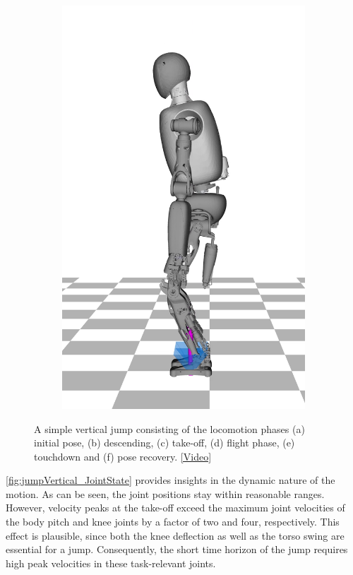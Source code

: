 \begin{figure}
\begin{subfigure}{.16\textwidth}
	\includegraphics[width=1\linewidth]{fig/jumpVertical/snaps/6x}
	\caption{}
\end{subfigure}%
\caption[A simple vertical jump]{A simple vertical jump consisting of the locomotion phases (a) initial pose, (b) descending, (c) take-off, (d) flight phase, (e) touchdown and (f) pose recovery. \href{https://github.com/julesser/ma-thesis-simulation-results/blob/master/Jump_Vertical_10cm_NoJLims/crocoddyl_side.mp4}{[Video]}}
\label{fig:jumpVertical_Snaps}
\end{figure} 

\cref{fig:jumpVertical_JointState} provides insights in the dynamic nature of the motion. As can be seen, the joint positions stay within reasonable ranges. However, velocity peaks at the take-off exceed the maximum joint velocities of the body pitch and knee joints by a factor of two and four, respectively. This effect is plausible, since both the knee deflection as well as the torso swing are essential for a jump. Consequently, the short time horizon of the jump requires high peak velocities in these task-relevant joints. 

